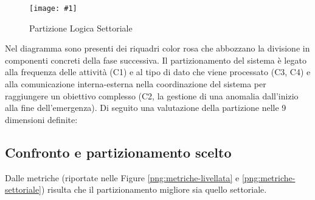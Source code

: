 \documentclass[a4paper,11pt,oneside, table]{article}
\newcommand{\bigimage}[4] {
	\begin{figure}[H]
	    \centering
	    \texttt{[image: \#1]}
	    \caption{#2}\label{#3}
	\end{figure}
}
\begin{document}
\bigimage{images/Diagramma delle Attivita'/Partizione Logica Settoriale.png}{Partizione Logica Settoriale}{png:act:partizione-logica-settoriale}{1}

Nel diagramma sono presenti dei riquadri color rosa che abbozzano la divisione in componenti concreti della fase successiva.
Il partizionamento del sistema \`e legato alla frequenza delle attivit\`a (C1) e al tipo di dato che viene processato (C3, C4) e alla comunicazione interna-esterna nella coordinazione del sistema per raggiungere un obiettivo complesso (C2, la gestione di una anomalia dall'inizio alla fine dell'emergenza).
Di seguito una valutazione della partizione nelle 9 dimensioni definite:

\begin{center}
\end{center}

\subsection{Confronto e partizionamento scelto}

Dalle metriche (riportate nelle Figure \ref{png:metriche-livellata} e \ref{png:metriche-settoriale}) risulta che il partizionamento migliore sia quello settoriale.
\end{document}
